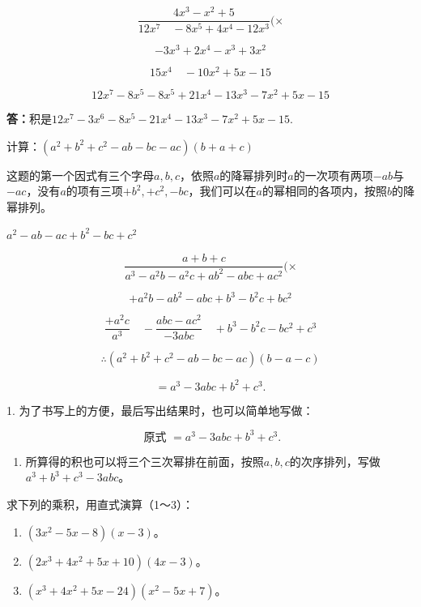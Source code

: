 \[
\frac{4 x ^{3} - x ^{2} + 5}{12 x ^{7} \quad - 8 x ^{5} + 4 x ^{4} - 12 x ^{3}} (\times
\]

\[
- 3 x ^{3} + 2 x ^{4} - x ^{3} + 3 x ^{2}
\]

\[
15 x ^{4} \quad - 10 x ^{2} + 5 x - 15
\]

\[
12 x ^{7} - 8 x ^{5} - 8 x ^{5} + 21 x ^{4} - 13 x ^{3} - 7 x ^{2} + 5 x - 15
\]

\textbf{答：}积是\(12x^{7} - 3x^{6} - 8x^{5} - 21x^{4} - 13x^{3} - 7x^{2} + 5x - 15.\)

计算：\((a^{2} + b^{2} + c^{2} - ab - bc - ac)(b + a + c)\)

这题的第一个因式有三个字母\(a, b, c\)，依照\(a\)的降幂排列时\(a\)的一次项有两项\(-ab\)与\(-ac\)，没有\(a\)的项有三项\(+b^2, +c^2, -bc\)，我们可以在\(a\)的幂相同的各项内，按照\(b\)的降幂排列。

\(a^2 - ab - ac + b^2 - bc + c^2\)

\[
\frac{a + b + c}{a ^{3} - a ^{2} b - a ^{2} c + a b ^{2} - a b c + a c ^{2}} (\times
\]

\[
+ a ^{2} b - a b ^{2} - a b c + b ^{3} - b ^{2} c + b c ^{2}
\]

\[
\frac{+ a ^{2} c}{a ^{3}} \quad - \frac{a b c - a c ^{2}}{- 3 a b c} \quad + b ^{3} - b ^{2} c - b c ^{2} + c ^{3}
\]

\[
\therefore (a ^{2} + b ^{2} + c ^{2} - a b - b c - a c) (b - a - c)
\]

\[
= a ^{3} - 3 a b c + b ^{2} + c ^{3}.
\]

 1.
为了书写上的方便，最后写出结果时，也可以简单地写做：

\[
\text{ 原式 } = a ^{3} - 3 a b c + b ^{3} + c ^{3}.
\]

\begin{enumerate}[start=2]
\item
  所算得的积也可以将三个三次幂排在前面，按照\(a, b, c\)的次序排列，写做\(a^3 + b^3 + c^3 - 3abc\)。
\end{enumerate}

求下列的乘积，用直式演算（1～3）：

\begin{enumerate}[start=1]
\item
  \((3x^{2} - 5x - 8)(x - 3)\)。
\item
  \((2x^{3} + 4x^{2} + 5x + 10)(4x - 3)\)。
\item
  \((x^{3} + 4x^{2} + 5x - 24)(x^{2} - 5x + 7)\)。
\end{enumerate}

